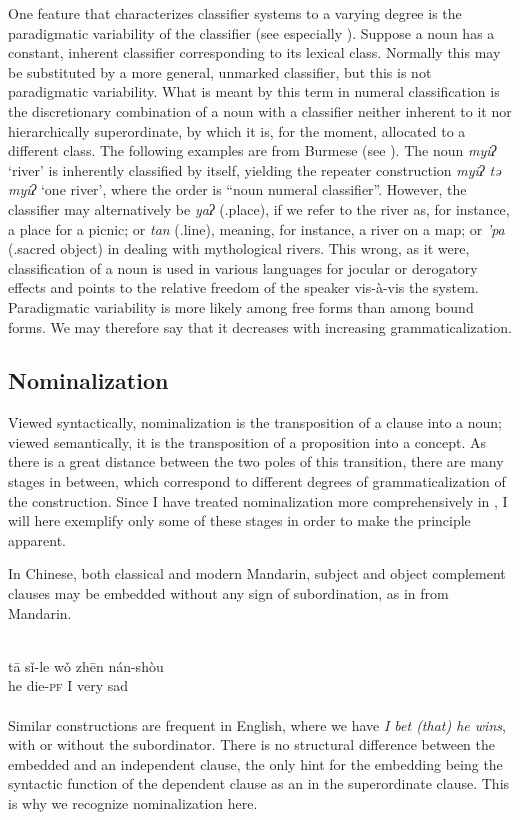 \label{page65}One feature that characterizes classifier systems to a varying degree is the paradigmatic variability of the classifier (see especially \citealt{Serzisko1982}). Suppose a noun has a constant, inherent classifier corresponding to its lexical class. Normally this may be substituted by a more general, unmarked classifier, but this is not paradigmatic variability. What is meant by this term in numeral classification is the discretionary combination of a noun with a classifier neither inherent to it nor hierarchically superordinate, by which it is, for the moment, allocated to a different class. The following examples are from Burmese (see \citealt[20]{Serzisko1980}). The noun \textit{myiʔ} ‘river’ is inherently classified by itself, yielding the repeater construction \textit{myiʔ tə myiʔ} ‘one river’, where the order is ``noun numeral classifier''. However, the classifier may alternatively be \textit{yaʔ} (\cl.place), if we refer to the river as, for instance, a place for a picnic; or \textit{tan} (\cl.line), meaning, for instance, a river on a map; or \textit{'pa} (\cl.sacred object) in dealing with mythological rivers. This wrong, as it were, classification of a noun is used in various languages for jocular or derogatory effects and points to the relative freedom of the speaker vis-à-vis the system. Paradigmatic variability is more likely among free forms than among bound forms. We may therefore say that it decreases with increasing grammaticalization.

\subsection{Nominalization} \label{sec:3.3.2}

Viewed syntactically, nominalization is the transposition of a clause into a noun; viewed semantically, it is the transposition of a proposition into a concept. As there is a great distance between the two poles of this transition, there are many stages in between, which correspond to different degrees of grammaticalization of the construction. Since I have treated nominalization more comprehensively in \citealt{Lehmann1982a}, I will here exemplify only some of these stages in order to make the principle apparent.

In Chinese, both classical and modern Mandarin, subject and object complement clauses may be embedded without any sign of subordination, as in  from Mandarin.

\ea\label{ex:E25}
\\
\gll   t\=a  s\v{i}-le  w\v{o}  zh\=en  nán-shòu\\
 he  die-\textsc{pf}  I  very  sad\\
\\
\z
\noindent Similar constructions are frequent in English, where we have \textit{I bet (that) he wins}, with or without the subordinator. There is no structural difference between the embedded and an independent clause, the only hint for the embedding being the syntactic function of the dependent clause as an \np in the superordinate clause. This is why we recognize nominalization here.

